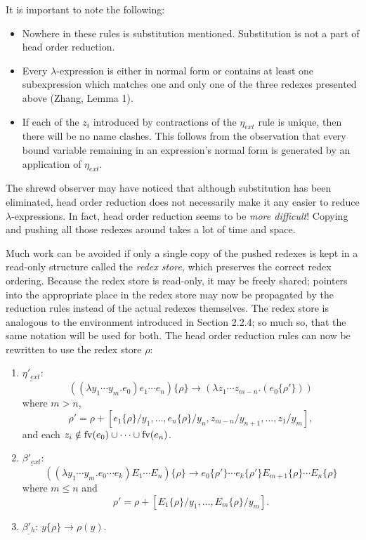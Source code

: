 It is important to note the following:

\begin{itemize}
\item Nowhere in these rules is substitution mentioned. Substitution is not a
part of head order reduction.
\item Every \(\lambda\)-expression is either in normal form or contains at
least one subexpression which matches one and only one of the three redexes
presented above (Zhang, Lemma 1).
\item If each of the \(z_i\) introduced by contractions of the \(\eta_{ext}\)
rule is unique, then there will be no name clashes. This follows from the
observation that every bound variable remaining in an expression's normal form
is generated by an application of \(\eta_{ext}\).
\end{itemize}

The shrewd observer may have noticed that although substitution has been
eliminated, head order reduction does not necessarily make it any easier to
reduce \(\lambda\)-expressions. In fact, head order reduction seems to be
\emph{more difficult}! Copying and pushing all those redexes around takes a lot
of time and space.

Much work can be avoided if only a single copy of the pushed redexes is kept in
a read-only structure called the \emph{redex store}, which preserves the correct
redex ordering. Because the redex store is read-only, it may be freely shared;
pointers into the appropriate place in the redex store may now be propagated by
the reduction rules instead of the actual redexes themselves. The redex store is
analogous to the environment introduced in Section 2.2.4; so much so, that the
same notation will be used for both. The head order reduction rules can now be
rewritten to use the redex store \(\rho\):

\begin{enumerate}
\item \(\underline{\eta'_{ext}}\):
\[
((\lambda y_1\cdots y_m.e_0)e_1\cdots e_n)\{\rho\}
\longrightarrow
(\lambda z_1\cdots z_{m-n}.(e_0\{\rho'\}))
\]
where \(m > n\),
\[
\rho'=\rho+[e_1\{\rho\}/y_1,\ldots,e_n\{\rho\}/y_n,
z_{m-n}/y_{n+1},\ldots,z_1/y_m],
\]
and each \(z_i \notin \operatorname{fv}(e_0)\cup\cdots\cup\operatorname{fv}(e_n)\).

\item \(\underline{\beta'_{ext}}\):
\[
((\lambda y_1\cdots y_m.e_0\cdots e_k)E_1\cdots E_n)\{\rho\}
\longrightarrow
e_0\{\rho'\}\cdots e_k\{\rho'\}E_{m+1}\{\rho\}\cdots E_n\{\rho\}
\]
where \(m \le n\) and
\[
\rho'=\rho+[E_1\{\rho\}/y_1,\ldots,E_m\{\rho\}/y_m].
\]

\item \(\underline{\beta'_h}\): \(y\{\rho\}\longrightarrow \rho(y)\).
\end{enumerate}

